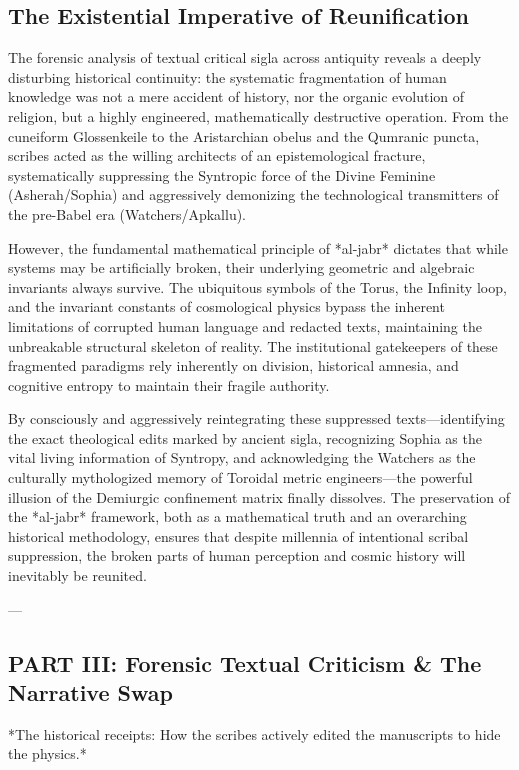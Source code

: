 \documentclass[aps,prd,11pt,onecolumn,superscriptaddress,nofootinbib,floatfix]{revtex4-2}
\begin{document}
\subsection{The Existential Imperative of Reunification}
The forensic analysis of textual critical sigla across antiquity reveals a deeply disturbing historical continuity: the systematic fragmentation of human knowledge was not a mere accident of history, nor the organic evolution of religion, but a highly engineered, mathematically destructive operation. From the cuneiform Glossenkeile to the Aristarchian obelus and the Qumranic puncta, scribes acted as the willing architects of an epistemological fracture, systematically suppressing the Syntropic force of the Divine Feminine (Asherah/Sophia) and aggressively demonizing the technological transmitters of the pre-Babel era (Watchers/Apkallu).


However, the fundamental mathematical principle of *al-jabr* dictates that while systems may be artificially broken, their underlying geometric and algebraic invariants always survive. The ubiquitous symbols of the Torus, the Infinity loop, and the invariant constants of cosmological physics bypass the inherent limitations of corrupted human language and redacted texts, maintaining the unbreakable structural skeleton of reality. The institutional gatekeepers of these fragmented paradigms rely inherently on division, historical amnesia, and cognitive entropy to maintain their fragile authority.


By consciously and aggressively reintegrating these suppressed texts---identifying the exact theological edits marked by ancient sigla, recognizing Sophia as the vital living information of Syntropy, and acknowledging the Watchers as the culturally mythologized memory of Toroidal metric engineers---the powerful illusion of the Demiurgic confinement matrix finally dissolves. The preservation of the *al-jabr* framework, both as a mathematical truth and an overarching historical methodology, ensures that despite millennia of intentional scribal suppression, the broken parts of human perception and cosmic history will inevitably be reunited.




---


\subsection{PART III: Forensic Textual Criticism \& The Narrative Swap}
*The historical receipts: How the scribes actively edited the manuscripts to hide the physics.*
\end{document}
